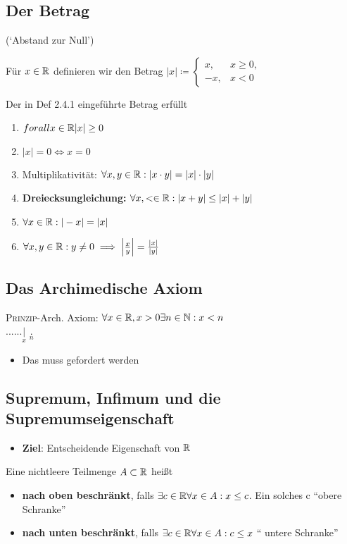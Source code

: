 \subsection{Der Betrag}
(`Abstand zur Null')
\begin{subdefinition}
	Für $ x \in \mathbb{R} $ definieren wir den Betrag $|x| \coloneqq \begin{cases}x,&x\geq0,\\-x,&x<0\end{cases}$
\end{subdefinition}
\begin{sublemma}
	Der in Def 2.4.1 eingeführte Betrag erfüllt
	\begin{enumerate}[label=(\roman*)]
		\item $ forall x \in \mathbb{R} |x| \geq 0$
		\item $ |x| = 0 \iff x = 0 $
		\item Multiplikativität: $ \forall x,y \in \mathbb{R} : | x\cdot y | = | x | \cdot | y | $
		\item {\color{yellow} \textbf{Dreiecksungleichung:} $ \forall x, < \in \mathbb{R}: | x + y | \leq | x | + | y |$ }
		\item $ \forall x \in \mathbb{R} : | -x| = | x | $
		\item $ \forall x, y \in \mathbb{R} :  y \neq 0 \implies \left| \frac{x}{y} \right| = \frac{|x|}{|y|} $
	\end{enumerate}
\end{sublemma}

\subsection{Das Archimedische Axiom}
\textsc{Prinzip}-Arch. Axiom: $ \forall x \in \mathbb{R}, x > 0 \exists n \in \mathbb{N} : x < n $\\
.\qquad.\qquad.\qquad.\qquad.\qquad.\quad$\underset{x}{|}$ $\underset{n}{.}$
\begin{itemize}
	\item Das muss gefordert werden
\end{itemize}

\subsection{Supremum, Infimum und die Supremumseigenschaft}
\begin{itemize}
	\item \textbf{Ziel}: Entscheidende Eigenschaft von $\mathbb{R}$
\end{itemize}
\begin{subdefinition}
	Eine nichtleere Teilmenge $ A \subset \mathbb{R} $ heißt
	\begin{itemize}
		\item \textbf{nach oben beschränkt}, falls $\exists c \in \mathbb{R} \forall x \in A: x \leq c $. Ein solches c ``obere Schranke''
		\item \textbf{nach unten beschränkt}, falls $ \exists c \in \mathbb{R} \forall x \in A: c \leq x $ `` untere Schranke''
	\end{itemize}
\end{subdefinition}

